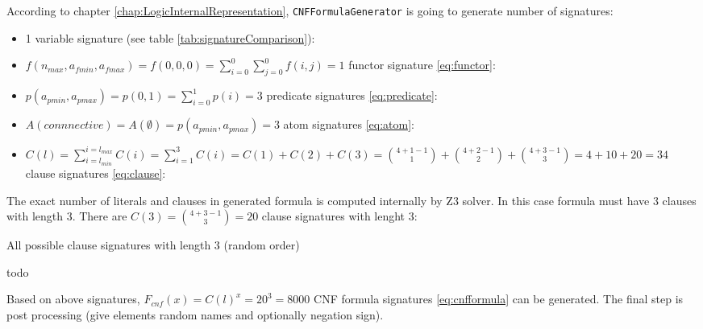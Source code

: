 According to chapter \ref{chap:LogicInternalRepresentation}, \texttt{CNFFormulaGenerator} is going to generate number of signatures:
\begin{itemize}
  \item 1 variable signature (see table \ref{tab:signatureComparison}): \tptpcodeinline{[V]}
  \item $f(n_{max}, a_{fmin}, a_{fmax}) = f(0, 0, 0) = \sum_{i=0}^{0} \sum_{j=0}^0 f(i, j) = 1$ functor signature \ref{eq:functor}: \tptpcodeinline{[f]}
  \item $p(a_{pmin}, a_{pmax}) = p(0, 1) = \sum_{i=0}^1 p(i) = 3$ predicate signatures \ref{eq:predicate}: \tptpcodeinline{[p, p(V), p(f)]}
  \item $A(connnective) = A(\emptyset) = p(a_{pmin}, a_{pmax}) = 3$ atom signatures \ref{eq:atom}: \tptpcodeinline{[p(V), p(f), p]}
  \item $C(l) = \sum_{i=l_{min}}^{i=l_{max}} C(i) = \sum_{i=1}^{3} C(i) = C(1) + C(2) + C(3) = \binom{4 + 1 -1}{1} + \binom{4 + 2 - 1}{2} + \binom{4 + 3 - 1}{3} = 4 + 10 + 20 = 34$ clause signatures \ref{eq:clause}:
\end{itemize}

The exact number of literals and clauses in generated formula is computed internally by Z3 solver. In this case formula must have 3 clauses with length 3.
There are $C(3) = \binom{4 + 3 - 1}{3} = 20$ clause signatures with lenght 3:

\begin{listing}[H]
  \caption{All possible clause signatures with length 3 (random order)}
\begin{tptpcode}
todo
\end{tptpcode}
\end{listing}

Based on above signatures, $F_{cnf}(x) = C(l)^x = 20^3 = 8000$ \gls{CNF} formula signatures \ref{eq:cnfformula} can be generated. The final step is post processing (give elements random names and optionally negation sign).
